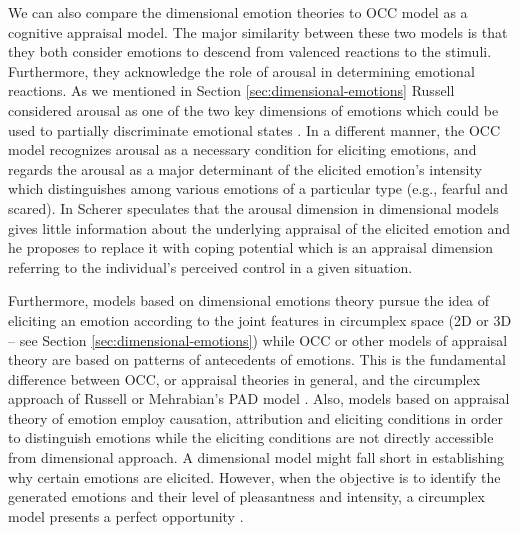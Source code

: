 \documentclass[11pt]{article}
\begin{document}
We can also compare the dimensional emotion theories to OCC model as a cognitive
appraisal model. The major similarity between these two models is that they both
consider emotions to descend from valenced reactions to the stimuli.
Furthermore, they acknowledge the role of arousal in determining emotional
reactions. As we mentioned in Section \ref{sec:dimensional-emotions} Russell
considered arousal as one of the two key dimensions of emotions which could be
used to partially discriminate emotional states
\cite{russell:circumplex-affect}. In a different manner, the OCC model
recognizes arousal as a necessary condition for eliciting emotions, and regards
the arousal as a major determinant of the elicited emotion's intensity which
distinguishes among various emotions of a particular type (e.g., fearful and
scared). In \cite{scherer:what-emotions} Scherer speculates that the arousal
dimension in dimensional models gives little information about the underlying
appraisal of the elicited emotion and he proposes to replace it with coping
potential which is an appraisal dimension referring to the individual's
perceived control in a given situation.

Furthermore, models based on dimensional emotions theory pursue the idea of
eliciting an emotion according to the joint features in circumplex space (2D or
3D -- see Section \ref{sec:dimensional-emotions}) while OCC or other
models of appraisal theory are based on patterns of antecedents of emotions.
This is the fundamental difference between OCC, or appraisal theories in
general, and the circumplex approach of Russell \cite{russell:circumplex-affect}
or Mehrabian's PAD model \cite{mehrabian:pad,mehrabian-russell:pad}. Also,
models based on appraisal theory of emotion employ causation, attribution and
eliciting conditions in order to distinguish emotions while the eliciting
conditions are not directly accessible from dimensional approach. A dimensional
model might fall short in establishing why certain emotions are elicited.
However, when the objective is to identify the generated emotions and their
level of pleasantness and intensity, a circumplex model presents a perfect
opportunity \cite{ahmadpour:occ-dimensional-comparison}.
\end{document}
